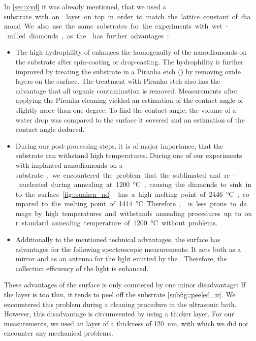	In \autoref{sec::cvd} it was already mentioned, that we used a \si substrate with an \ir layer on top in order to match the lattice constant of diamond.
	We also use the same substrates for the experiments with wet-milled diamonds, as the \ir has further advantages:
	\begin{itemize}
		\item The high hydrophility of \ir {} enhances the homogenuity of the nanodiamonds on the substrate after spin-coating or drop-casting. 
		The hydrophility is further improved by treating the substrate in a Piranha etch () by removing oxide layers on the surface. 
		The treatment with Piranha etch also has the advantage that all organic contamination is removed.
		Measurements after applying the Piranha cleaning yielded an estimation of the contact angle of slightly more than one degree.
		To find the contact angle, the volume of a water drop was compared to the surface it covered and an estimation of the contact angle deduced.
		\item During our post-processing steps, it is of major importance, that the substrate can withstand high temperatures.
		During one of our experiments with implanted nanodiamonds on a \si substrate, we encountered the problem that the \si sublimated and re-nucleated during annealing at \SI{1200}{\celsius}, causing the diamonds to sink into the \si surface \ref{fig::sunken_nd}.
		\Ir has a high melting point of \SI{2446}{\celsius}, compared to the melting point of \SI{1414}{\celsius}.
		Therefore, \ir is less prone to damage by high temperatures and withstands annealing procedures up to our standard annealing temperature of \SI{1200}{\celsius} without problems.
		\item Additionally to the mentioned technical advantages, the \ir surface has advantages for the following spectroscopic measurements: 
		It acts both as a mirror and as an antenna for the \fl light emitted by the \siv \cite{}.
		Therefore, the collection efficiency of the \fl light is enhanced.
	\end{itemize}
	These advantages of the \ir surface is only countered by one minor disadvantage:
	If the \ir layer is too thin, it tends to peel off the substrate \autoref{subfig::peeled_ir}.
	We encountered this problem during a cleaning procedure in the ultrasonic bath.
	However, this disadvantage is circumvented by using a thicker \ir layer.
	For our measurements, we used an \Ir layer of a thickness of \SI{120}{nm}, with which we did not encounter any mechanical problems.
